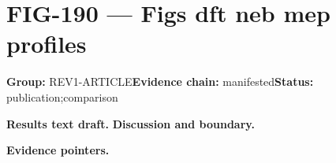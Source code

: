 \clearpage
\section{FIG-190 --- Figs dft neb mep profiles}
\label{figpage:fig-190}
\textbf{Group:} REV1-ARTICLE\quad \textbf{Evidence chain:} manifested\quad \textbf{Status:} publication;comparison

\textbf{Results text draft.} 
\textbf{Discussion and boundary.} 


\textbf{Evidence pointers.}



\vfill
